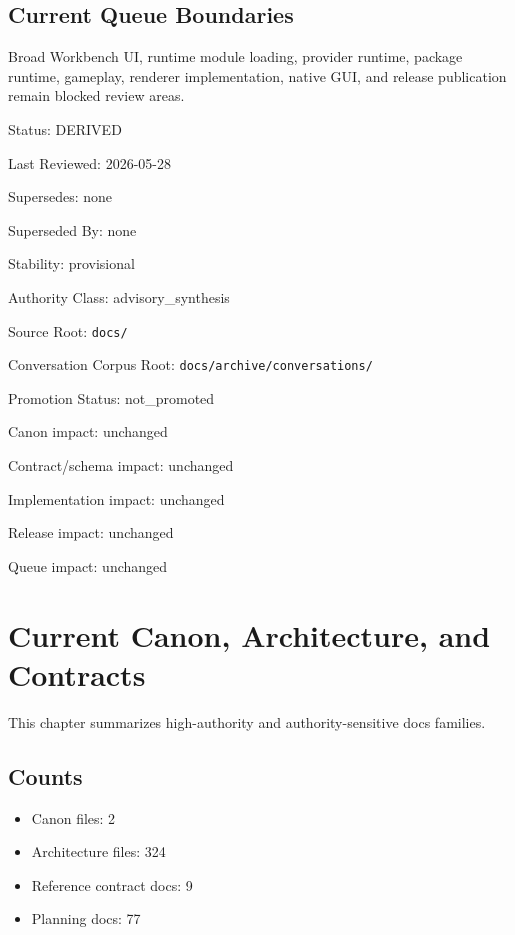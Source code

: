\documentclass[10.5pt,a4paper]{book}
\begin{document}
\chapter{Current Queue Boundaries}

Broad Workbench UI, runtime module loading, provider runtime, package runtime, gameplay, renderer implementation, native GUI, and release publication remain blocked review areas.\allowbreak{}



Status: DERIVED

Last Reviewed: 2026-\allowbreak{}05-\allowbreak{}28

Supersedes: none

Superseded By: none

Stability: provisional

Authority Class: advisory\_\allowbreak{}synthesis

Source Root: \texttt{docs/\allowbreak{}}

Conversation Corpus Root: \texttt{docs/\allowbreak{}archive/\allowbreak{}conversations/\allowbreak{}}

Promotion Status: not\_\allowbreak{}promoted

Canon impact: unchanged

Contract/\allowbreak{}schema impact: unchanged

Implementation impact: unchanged

Release impact: unchanged

Queue impact: unchanged


\part{Current Canon, Architecture, and Contracts}

This chapter summarizes high-\allowbreak{}authority and authority-\allowbreak{}sensitive docs families.\allowbreak{}


\chapter{Counts}

\begin{itemize}
\item Canon files: 2
\item Architecture files: 324
\item Reference contract docs: 9
\item Planning docs: 77
\end{itemize}
\end{document}
